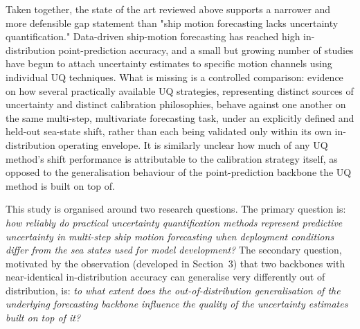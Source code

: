 \documentclass[a4paper,fleqn]{cas-sc}
\begin{document}
Taken together, the state of the art reviewed above supports a narrower and more defensible gap statement than "ship motion forecasting lacks uncertainty quantification." Data-driven ship-motion forecasting has reached high in-distribution point-prediction accuracy, and a small but growing number of studies have begun to attach uncertainty estimates to specific motion channels using individual UQ techniques. What is missing is a controlled comparison: evidence on how several practically available UQ strategies, representing distinct sources of uncertainty and distinct calibration philosophies, behave against one another on the same multi-step, multivariate forecasting task, under an explicitly defined and held-out sea-state shift, rather than each being validated only within its own in-distribution operating envelope. It is similarly unclear how much of any UQ method's shift performance is attributable to the calibration strategy itself, as opposed to the generalisation behaviour of the point-prediction backbone the UQ method is built on top of.

This study is organised around two research questions. The primary question is: \emph{how reliably do practical uncertainty quantification methods represent predictive uncertainty in multi-step ship motion forecasting when deployment conditions differ from the sea states used for model development?} The secondary question, motivated by the observation (developed in Section~3) that two backbones with near-identical in-distribution accuracy can generalise very differently out of distribution, is: \emph{to what extent does the out-of-distribution generalisation of the underlying forecasting backbone influence the quality of the uncertainty estimates built on top of it?}
\end{document}

